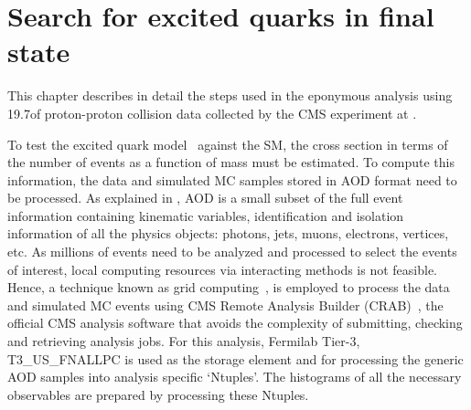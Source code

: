 \chapter{Search for excited quarks in \gamjet final state}\label{ch:QstarAnalysis}

This chapter describes in detail the steps used in the eponymous analysis 
using 19.7\fbinv of proton-proton collision data collected by the CMS experiment at \sqrteighttev.

To test the excited quark model~\cite{Baur:1987ga,Baur:1989kv,Bhattacharya:2009xg} against the SM, the cross section in terms 
of the number of events as a function of \gamjet mass must be estimated. To compute this information, the data and simulated MC samples 
stored in \gls{AOD} format need to be processed. As explained in \sectn{\ref{Se:Software}}, AOD is a small subset of the full event information
containing kinematic variables, identification and isolation information of all the physics objects: photons, jets, muons, electrons, vertices, etc.
As millions of events need to be analyzed and processed to select the events of interest, local computing resources via interacting methods is 
not feasible. Hence, a technique known as grid computing~\cite{Eck:840543}, is employed to process the data and simulated \gls{MC} events using 
CMS Remote Analysis Builder (\gls{CRAB})~\cite{Sala:1358821}, the official CMS analysis software that avoids the complexity of submitting, checking 
and retrieving analysis jobs. For this analysis, Fermilab Tier-3, T3\_US\_FNALLPC is used as the storage element and for processing the generic AOD 
samples into analysis specific `Ntuples'. The histograms of all the necessary observables are prepared by processing these Ntuples. 

